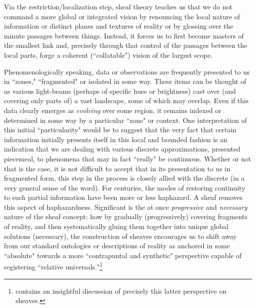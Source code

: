 \documentclass[11pt]{book}
\theoremstyle{definition}
\theoremstyle{definition}
\theoremstyle{definition}
\theoremstyle{theorem}
\theoremstyle{definition}
\begin{document}
Via the restriction/localization step, sheaf theory teaches us that we do not command a more global or integrated vision by renouncing the local nature of information or distinct planes and textures of reality or by glossing over the minute passages between things. Instead, it forces us to first become masters of the smallest link and, precisely through that control of the passages between the local parts, forge a coherent (``collatable") vision of the largest scope. \par 
Phenomenologically speaking, data or observations are frequently presented to us in ``zones," ``fragmented" or isolated in some way. These items can be thought of as various light-beams (perhaps of specific hues or brightness) cast over (and covering only parts of) a vast landscape, some of which may overlap. Even if this data clearly emerges as \textit{evolving} over some region, it remains indexed or determined in some way by a particular ``zone" or context. One interpretation of this initial ``particularity" would be to suggest that the very fact that certain information initially presents itself in this local and bounded fashion is an indication that we are dealing with various discrete approximations, presented piecemeal, to phenomena that may in fact ``really" be continuous. Whether or not that is the case, it is not difficult to accept that in its presentation to us in fragmented form, this step in the process is closely allied with the discrete (in a very general sense of the word). For centuries, the modes of restoring continuity to such partial information have been more or less haphazard. A sheaf removes this aspect of haphazardness. Significant is the at once \textit{progressive} and \textit{necessary} nature of the sheaf concept: how by gradually (progressively) covering fragments of reality, and then systematically gluing them together into unique global solutions (necessary), the construction of sheaves encourages us to shift away from our standard ontologies or descriptions of reality as anchored in some ``absolute" towards a more ``contrapuntal and synthetic" perspective capable of registering ``relative universals."\footnote{\cite{zalamea_synthetic_2013} contains an insightful discussion of precisely this latter perspective on sheaves.}\par 
\end{document}

